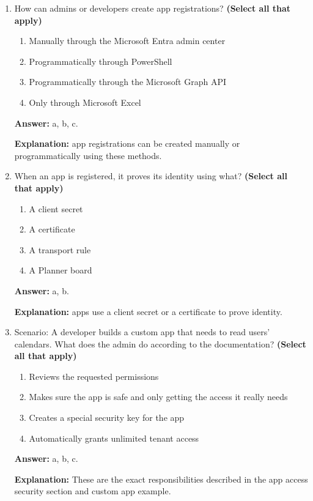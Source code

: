 \documentclass[10pt]{article}
\begin{document}
\begin{enumerate}[leftmargin=*]
\textbf{Explanation:} These are the exact registration details listed in the documentation.

\item How can admins or developers create app registrations? \textbf{(Select all that apply)}
\begin{enumerate}[label=\alph*., leftmargin=1.5em]
\item Manually through the Microsoft Entra admin center
\item Programmatically through PowerShell
\item Programmatically through the Microsoft Graph API
\item Only through Microsoft Excel
\end{enumerate}
\textbf{Answer:} a, b, c.

\textbf{Explanation:} app registrations can be created manually or programmatically using these methods.

\item When an app is registered, it proves its identity using what? \textbf{(Select all that apply)}
\begin{enumerate}[label=\alph*., leftmargin=1.5em]
\item A client secret
\item A certificate
\item A transport rule
\item A Planner board
\end{enumerate}
\textbf{Answer:} a, b.

\textbf{Explanation:} apps use a client secret or a certificate to prove identity.

\item Scenario: A developer builds a custom app that needs to read users’ calendars. What does the admin do according to the documentation? \textbf{(Select all that apply)}
\begin{enumerate}[label=\alph*., leftmargin=1.5em]
\item Reviews the requested permissions
\item Makes sure the app is safe and only getting the access it really needs
\item Creates a special security key for the app
\item Automatically grants unlimited tenant access
\end{enumerate}
\textbf{Answer:} a, b, c.

\textbf{Explanation:} These are the exact responsibilities described in the app access security section and custom app example.


\end{enumerate}
\end{document}
